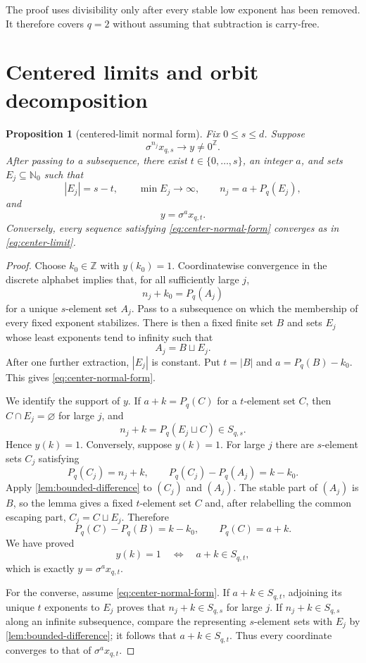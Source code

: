 \documentclass[11pt,a4paper]{amsart}
\newtheorem{proposition}[theorem]{Proposition}
\theoremstyle{definition}
\theoremstyle{remark}
\newcommand{\N}{\mathbb N}
\newcommand{\Z}{\mathbb Z}
\newcommand{\zero}{0^{\Z}}
\newcommand{\pq}{P_q}
\begin{document}
The proof uses divisibility only after every stable low exponent has been
removed.  It therefore covers $q=2$ without assuming that subtraction is
carry-free.

\section{Centered limits and orbit decomposition}

\begin{proposition}[centered-limit normal form]\label{prop:centered-limits}
Fix $0\leq s\leq d$.  Suppose
\[
 \sigma^{n_j}x_{q,s}\longrightarrow y\neq\zero.
\]
After passing to a subsequence, there exist $t\in\{0,\ldots,s\}$, an integer
$a$, and sets $E_j\subseteq\N_0$ such that
\begin{equation}\label{eq:center-normal-form}
 |E_j|=s-t,
 \qquad \min E_j\longrightarrow\infty,
 \qquad n_j=a+\pq(E_j),
\end{equation}
and
\begin{equation}\label{eq:center-limit}
 y=\sigma^a x_{q,t}.
\end{equation}
Conversely, every sequence satisfying \eqref{eq:center-normal-form}
converges as in \eqref{eq:center-limit}.
\end{proposition}

\begin{proof}
Choose $k_0\in\Z$ with $y(k_0)=1$.  Coordinatewise convergence in the
discrete alphabet implies that, for all sufficiently large $j$,
\[
 n_j+k_0=\pq(A_j)
\]
for a unique $s$-element set $A_j$.  Pass to a subsequence on which the
membership of every fixed exponent stabilizes.  There is then a fixed finite
set $B$ and sets $E_j$ whose least exponents tend to infinity such that
\[
 A_j=B\sqcup E_j.
\]
After one further extraction, $|E_j|$ is constant.  Put
$t=|B|$ and $a=\pq(B)-k_0$.  This gives
\eqref{eq:center-normal-form}.

We identify the support of $y$.  If $a+k=\pq(C)$ for a $t$-element set
$C$, then $C\cap E_j=\varnothing$ for large $j$, and
\[
 n_j+k=\pq(E_j\sqcup C)\in S_{q,s}.
\]
Hence $y(k)=1$.  Conversely, suppose $y(k)=1$.  For large $j$ there are
$s$-element sets $C_j$ satisfying
\[
 \pq(C_j)=n_j+k,
 \qquad
 \pq(C_j)-\pq(A_j)=k-k_0.
\]
Apply \cref{lem:bounded-difference} to $(C_j)$ and $(A_j)$.  The stable
part of $(A_j)$ is $B$, so the lemma gives a fixed $t$-element set $C$ and,
after relabelling the common escaping part, $C_j=C\sqcup E_j$.  Therefore
\[
 \pq(C)-\pq(B)=k-k_0,
 \qquad \pq(C)=a+k.
\]
We have proved
\[
 y(k)=1\quad\Longleftrightarrow\quad a+k\in S_{q,t},
\]
which is exactly $y=\sigma^a x_{q,t}$.

For the converse, assume \eqref{eq:center-normal-form}.  If
$a+k\in S_{q,t}$, adjoining its unique $t$ exponents to $E_j$ proves that
$n_j+k\in S_{q,s}$ for large $j$.  If $n_j+k\in S_{q,s}$ along an infinite
subsequence, compare the representing $s$-element sets with $E_j$ by
\cref{lem:bounded-difference}; it follows that $a+k\in S_{q,t}$.  Thus every
coordinate converges to that of $\sigma^a x_{q,t}$.
\end{proof}
\end{document}
